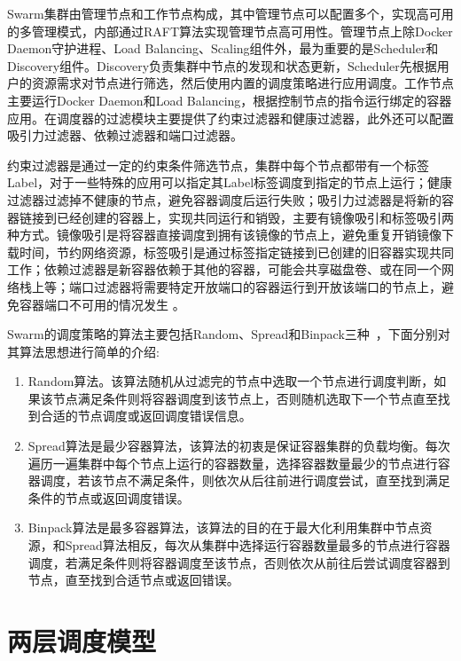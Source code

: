Swarm集群由管理节点和工作节点构成，其中管理节点可以配置多个，实现高可用的多管理模式，内部通过RAFT算法实现管理节点高可用性。管理节点上除Docker Daemon守护进程、Load Balancing、Scaling组件外，最为重要的是Scheduler和Discovery组件。Discovery负责集群中节点的发现和状态更新，Scheduler先根据用户的资源需求对节点进行筛选，然后使用内置的调度策略进行应用调度。工作节点主要运行Docker Daemon和Load Balancing，根据控制节点的指令运行绑定的容器应用。在调度器的过滤模块主要提供了约束过滤器和健康过滤器，此外还可以配置吸引力过滤器、依赖过滤器和端口过滤器。

约束过滤器是通过一定的约束条件筛选节点，集群中每个节点都带有一个标签Label，对于一些特殊的应用可以指定其Label标签调度到指定的节点上运行；健康过滤器过滤掉不健康的节点，避免容器调度后运行失败；吸引力过滤器是将新的容器链接到已经创建的容器上，实现共同运行和销毁，主要有镜像吸引和标签吸引两种方式。镜像吸引是将容器直接调度到拥有该镜像的节点上，避免重复开销镜像下载时间，节约网络资源，标签吸引是通过标签指定链接到已创建的旧容器实现共同工作；依赖过滤器是新容器依赖于其他的容器，可能会共享磁盘卷、或在同一个网络栈上等；端口过滤器将需要特定开放端口的容器运行到开放该端口的节点上，避免容器端口不可用的情况发生	。

Swarm的调度策略的算法主要包括Random、Spread和Binpack三种~\cite{Cerin2017A}，下面分别对其算法思想进行简单的介绍:
\begin{enumerate}[1.]
	\item Random算法。该算法随机从过滤完的节点中选取一个节点进行调度判断，如果该节点满足条件则将容器调度到该节点上，否则随机选取下一个节点直至找到合适的节点调度或返回调度错误信息。
	\item Spread算法是最少容器算法，该算法的初衷是保证容器集群的负载均衡。每次遍历一遍集群中每个节点上运行的容器数量，选择容器数量最少的节点进行容器调度，若该节点不满足条件，则依次从后往前进行调度尝试，直至找到满足条件的节点或返回调度错误。
	\item Binpack算法是最多容器算法，该算法的目的在于最大化利用集群中节点资源，和Spread算法相反，每次从集群中选择运行容器数量最多的节点进行容器调度，若满足条件则将容器调度至该节点，否则依次从前往后尝试调度容器到节点，直至找到合适节点或返回错误。
\end{enumerate}

\section{两层调度模型}
